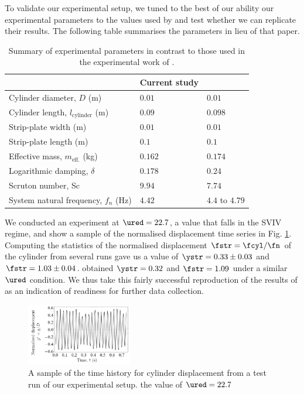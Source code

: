 \documentclass[a4paper,fleqn]{cas-sc}
\begin{document}
To validate our experimental setup, we tuned to the best of our ability our experimental parameters to the values used by \citet{Koide2013} and test whether we can replicate their results. The following table summarises the parameters in lieu of that paper.

\begin{table}[width=0.9\linewidth,cols=3,pos=h]
  \caption{Summary of experimental parameters in contrast to those used in the experimental work of \citet{Koide2013}.} \label{tab:expParameter}
\begin{tabular*}{\tblwidth}{@{} LLL@{} }
\toprule
                                           & Current study & \citet{Koide2013}\\
\midrule
Cylinder diameter, $D$ (m)                 & $0.01$        & $0.01$           \\
Cylinder length, $l_{\text{cylinder}}$ (m) & $0.09$        & $0.098$          \\
Strip-plate width (m)                      & $0.01$        & $0.01$           \\
Strip-plate length (m)                     & $0.1$         & $0.1$            \\
Effective mass, $m_{\text{eff.}}$ (kg)     & $0.162$       & $0.174$          \\
Logarithmic damping, $\delta$              & $0.178$       & $0.24$           \\
Scruton number, Sc                         & $9.94$        & $7.74$           \\
System natural frequency, $f_{n}$ (Hz)     & $4.42$        & $4.4$ to $4.79$  \\
\bottomrule
\end{tabular*}
\end{table}

We conducted an experiment at $\ured = 22.7$, a value that falls in the SVIV regime, and show a sample of the normalised displacement time series in Fig. \ref{fig:sampTimeHist}. Computing the statistics of the normalised displacement $\fstr = \fcyl/\fn$ of the cylinder from several runs gave us a value of $\ystr = 0.33 \pm 0.03$ and $\fstr = 1.03 \pm 0.04$. \citet{Koide2013} obtained $\ystr = 0.32$  and $\fstr = 1.09$ under a similar $\ured$ condition. We thus take this fairly successful reproduction of the results of \citet{Koide2013} as an indication of readiness for further data collection.

\begin{figure}
  \centering
  \includegraphics[width=0.41\textwidth]{figs/figure5}
  \caption{A sample of the time history for cylinder displacement from a test run of our experimental setup. the value of $\ured = 22.7$}
  \label{fig:sampTimeHist}
\end{figure}
\end{document}
